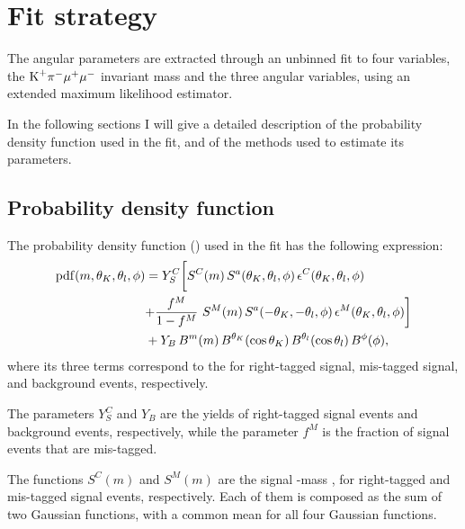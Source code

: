 \chapter{Fit strategy} \label{sec:fit}

The angular parameters are extracted through an unbinned fit to four variables, the $\textrm{K}^{+}\pi^{-}\mu^{+}\mu^{-}$ invariant mass and the three angular variables, using an extended maximum likelihood estimator.

In the following sections I will give a detailed description of the probability density function used in the fit, and of the methods used to estimate its parameters.

\section{Probability density function}
\label{sec:TotalPDF}

The probability density function (\pdf) used in the fit has the following expression:
\begin{equation} \label{eq:angALL}
  \begin{split}
    \mathrm{pdf}(m,\theta_K,\theta_l,\phi) & = Y^{C}_{S} \biggl[ S^{C}(m)  \, S^a(\theta_K,\theta_l,\phi) \, \epsilon^{C}(\theta_K,\theta_l,\phi) \biggr. \\
      & \biggl. + \frac{f^{M}}{1-f^{M}}~S^{M}(m) \, S^a(-\theta_K,-\theta_l,\phi) \, \epsilon^{M}(\theta_K,\theta_l,\phi) \biggr] \\
    & + Y_{B}\,B^m(m) \, B^{\theta_K}(\cos\theta_K) \, B^{\theta_l}(\cos\theta_l) \, B^{\phi}(\phi), \\
  \end{split}
\end{equation}
where its three terms correspond to the \pdfs for right-tagged signal, mis-tagged signal, and background events, respectively.

The parameters $Y^{C}_{S}$ and $Y_{B}$ are the yields of right-tagged signal events and background events, respectively, while the parameter $f^{M}$ is the fraction of signal events that are mis-tagged.

The functions $S^{C}(m)$ and $S^{M}(m)$ are the signal \PBz-mass \pdfs, for right-tagged and mis-tagged signal events, respectively.
Each of them is composed as the sum of two Gaussian functions, with a common mean for all four Gaussian functions.

